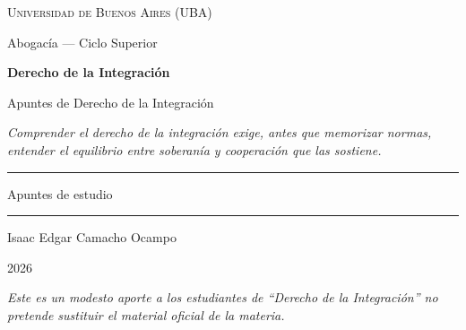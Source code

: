 \documentclass[12pt,oneside]{book}
\newcommand{\universidad}{Universidad de Buenos Aires (UBA)}
\newcommand{\carrera}{Abogacía --- Ciclo Superior}
\newcommand{\materia}{Derecho de la Integración}
\newcommand{\titulo}{Apuntes de Derecho de la Integración}
\newcommand{\autor}{Isaac Edgar Camacho Ocampo}
\newcommand{\anio}{2026}
\begin{document}
\begin{titlepage}

\thispagestyle{empty}

\begin{center}

\vspace*{1cm}

{\large \textsc{\universidad}}

\vspace{0.2cm}

{\large \carrera}

\vspace{3cm}

{\Huge \textbf{\materia}}

\vspace{1cm}

{\LARGE \titulo}

\vspace{0.8cm}

\textit{Comprender el derecho de la integración exige, antes que memorizar normas, entender el equilibrio entre soberanía y cooperación que las sostiene.}

\vspace{1.2cm}

\rule{0.70\textwidth}{0.5pt}

\vspace{0.5cm}

{\large Apuntes de estudio}

\vspace{0.5cm}

\rule{0.70\textwidth}{0.5pt}

\vfill

{\large \autor}

\vspace{0.3cm}

{\large \anio}

\end{center}

\vfill

\begin{flushleft}
\textit{Este es un modesto aporte a los estudiantes de ``Derecho de la Integración'' no pretende sustituir el material oficial de la materia.}
\end{flushleft}

\end{titlepage}
\end{document}
